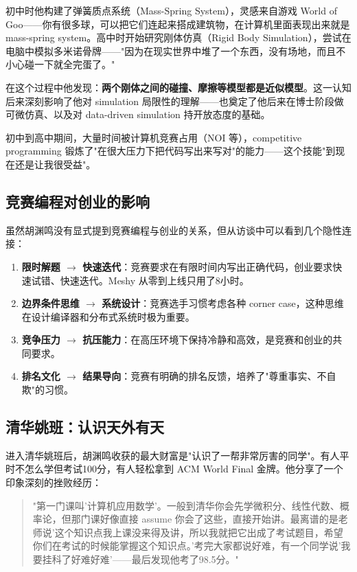 初中时他构建了弹簧质点系统（Mass-Spring System），灵感来自游戏 World of Goo——你有很多球，可以把它们连起来搭成建筑物，在计算机里面表现出来就是 mass-spring system。高中时开始研究刚体仿真（Rigid Body Simulation），尝试在电脑中模拟多米诺骨牌——"因为在现实世界中堆了一个东西，没有场地，而且不小心碰一下就全完蛋了。"

在这个过程中他发现：\textbf{两个刚体之间的碰撞、摩擦等模型都是近似模型}。这一认知后来深刻影响了他对 simulation 局限性的理解——也奠定了他后来在博士阶段做可微仿真、以及对 data-driven simulation 持开放态度的基础。

初中到高中期间，大量时间被计算机竞赛占用（NOI 等），competitive programming 锻炼了"在很大压力下把代码写出来写对"的能力——这个技能"到现在还是让我很受益"。

\subsection{竞赛编程对创业的影响}

虽然胡渊鸣没有显式提到竞赛编程与创业的关系，但从访谈中可以看到几个隐性连接：

\begin{enumerate}
\item \textbf{限时解题 $\rightarrow$ 快速迭代}：竞赛要求在有限时间内写出正确代码，创业要求快速试错、快速迭代。Meshy 从零到上线只用了8小时。
\item \textbf{边界条件思维 $\rightarrow$ 系统设计}：竞赛选手习惯考虑各种 corner case，这种思维在设计编译器和分布式系统时极为重要。
\item \textbf{竞争压力 $\rightarrow$ 抗压能力}：在高压环境下保持冷静和高效，是竞赛和创业的共同要求。
\item \textbf{排名文化 $\rightarrow$ 结果导向}：竞赛有明确的排名反馈，培养了"尊重事实、不自欺"的习惯。
\end{enumerate}

\subsection{清华姚班：认识天外有天}

进入清华姚班后，胡渊鸣收获的最大财富是"认识了一帮非常厉害的同学"。有人平时不怎么学但考试100分，有人轻松拿到 ACM World Final 金牌。他分享了一个印象深刻的挫败经历：

\begin{quote}
"第一门课叫'计算机应用数学'。一般到清华你会先学微积分、线性代数、概率论，但那门课好像直接 assume 你会了这些，直接开始讲。最离谱的是老师说'这个知识点我上课没来得及讲，所以我就把它出成了考试题目，希望你们在考试的时候能掌握这个知识点。'考完大家都说好难，有一个同学说'我要挂科了好难好难'——最后发现他考了98.5分。"
\end{quote}

